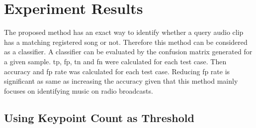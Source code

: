 \section{Experiment Results}

The proposed method has an exact way to identify whether a query audio clip has a matching registered song or not. Therefore this method can be considered as
a classifier. A classifier can be evaluated by the confusion matrix generated for a given sample. \ac{tp}, \ac{fp}, \ac{tn} and \ac{fn} were calculated
for each test case. Then accuracy and \ac{fp} rate was calculated for each test case. Reducing \ac{fp} rate is significant as same as increasing the accuracy
given that this method mainly focuses on identifying music on radio broadcasts.   

\subsection{Using Keypoint Count as Threshold}

